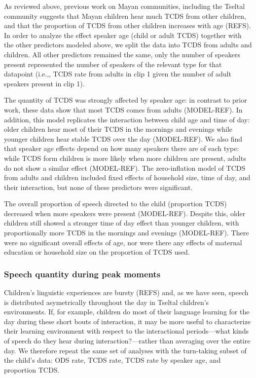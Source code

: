 \documentclass[floatsintext,man]{apa6}
\theoremstyle{definition}
\theoremstyle{definition}
\theoremstyle{definition}
\theoremstyle{remark}
\begin{document}
As reviewed above, previous work on Mayan communities, including the
Tseltal community suggests that Mayan children hear much TCDS from other
children, and that the proportion of TCDS from other children increases
with age (REFS). In order to analyze the effect speaker age (child or
adult TCDS) together with the other predictors modeled above, we split
the data into TCDS from adults and children. All other predictors
remained the same, only the number of speakers present represented the
number of speakers of the relevant type for that datapoint (i.e.,, TCDS
rate from adults in clip 1 given the number of adult speakers present in
clip 1).

The quantity of TCDS was strongly affected by speaker age: in contrast
to prior work, these data show that most TCDS comes from adults
(MODEL-REF). In addition, this model replicates the interaction between
child age and time of day: older children hear most of their TCDS in the
mornings and evenings while younger children hear stable TCDS over the
day (MODEL-REF). We also find that speaker age effects depend on how
many speakers there are of each type: while TCDS form children is more
likely when more children are present, adults do not show a similar
effect (MODEL-REF). The zero-inflation model of TCDS from adults and
children included fixed effects of household size, time of day, and
their interaction, but none of these predictors were significant.

The overall proportion of speech directed to the child (proportion TCDS)
decreased when more speakers were present (MODEL-REF). Despite this,
older children still showed a stronger time of day effect than younger
children, with proportionally more TCDS in the mornings and evenings
(MODEL-REF). There were no significant overall effects of age, nor were
there any effects of maternal education or household size on the
proportion of TCDS used.

\subsubsection{Speech quantity during peak
moments}\label{speech-quantity-during-peak-moments}

Children's linguistic experiences are bursty (REFS) and, as we have
seen, speech is distributed asymetrically throughout the day in Tseltal
children's environments. If, for example, children do most of their
language learning for the day during these short bouts of interaction,
it may be more useful to characterize their learning environment with
respect to the interactional periods---what kinds of speech do they hear
during interaction?---rather than averaging over the entire day. We
therefore repeat the same set of analyses with the turn-taking subset of
the child's data: ODS rate, TCDS rate, TCDS rate by speaker age, and
proportion TCDS.
\end{document}
